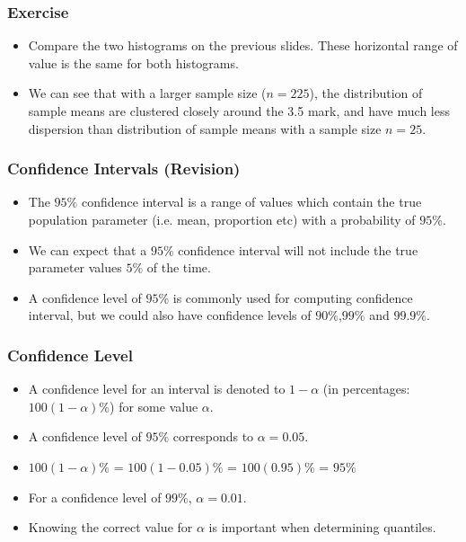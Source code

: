 
\begin{frame}
\frametitle{Exercise}
\begin{itemize}
\item Compare the two histograms on the previous slides. These horizontal range of value is the same for both histograms.

\item We can see that with a larger sample size ($n=225$), the distribution of sample means are clustered closely around the 3.5 mark, and have much less dispersion than distribution of sample means with a sample size $n=25$.

\end{itemize}
\end{frame}
\begin{frame}
\frametitle{Confidence Intervals (Revision) }

\begin{itemize}
\item The $95\%$ confidence interval is a range of values which contain the true population parameter (i.e. mean, proportion etc) with a probability of $95\%$.
\item We can expect that a $95\%$ confidence interval will not include the true parameter values $5\%$ of the time.
\item A confidence level of $95\%$ is commonly used for computing confidence interval, but we could also have confidence levels of $90\%$,$99\%$ and $99.9\%$.
\end{itemize}

\end{frame}



\begin{frame}
\frametitle{Confidence Level}

\begin{itemize}
\item A confidence level for an interval is denoted to $1-\alpha$ (in percentages: $100(1-\alpha)\%$) for some value $\alpha$.
\item A confidence level of $95\%$ corresponds to $\alpha = 0.05$.
\item $100(1-\alpha)\%$ = $100(1-0.05)\%$  = $100(0.95)\%$ = $95\%$
\item For a confidence level of $99\%$, $\alpha = 0.01$.
\item Knowing the correct value for $\alpha$ is important when determining quantiles.
\end{itemize}

\end{frame}


